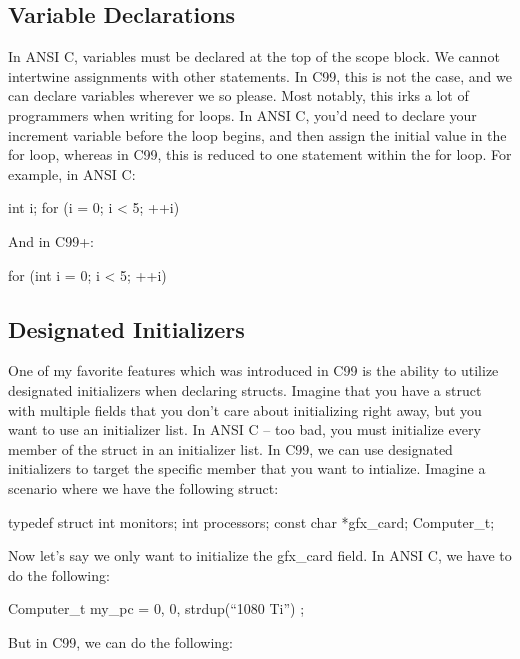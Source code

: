 \documentclass{article}
\begin{document}
\subsection{Variable Declarations}

In ANSI C, variables must be declared at the top of the scope block. We cannot intertwine assignments with
other statements. In C99, this is not the case, and we can declare variables wherever we so please. Most
notably, this irks a lot of programmers when writing for loops. In ANSI C, you’d need to declare your
increment variable before the loop begins, and then assign the initial value in the for loop, whereas in C99,
this is reduced to one statement within the for loop. For example, in ANSI C:

\begin{cblk}
int i;
for (i = 0; i < 5; ++i)
\end{cblk}

And in C99+:

\begin{cblk}
for (int i = 0; i < 5; ++i)
\end{cblk}

\subsection{Designated Initializers}

One of my favorite features which was introduced in C99 is the ability to utilize designated initializers
when declaring structs. Imagine that you have a struct with multiple fields that you don’t care about
initializing right away, but you want to use an initializer list. In ANSI C – too bad, you must initialize
every member of the struct in an initializer list. In C99, we can use designated initializers to target the
specific member that you want to intialize. Imagine a scenario where we have the following struct:

\begin{cblk}
typedef struct {
    int monitors;
    int processors;
    const char *gfx_card;
} Computer_t;
\end{cblk}

Now let’s say we only want to initialize the gfx_card field. In ANSI C, we have to do the following:

\begin{cblk}
Computer_t my_pc = { 0, 0, strdup(“1080 Ti”) };
\end{cblk}

But in C99, we can do the following:
\end{document}
